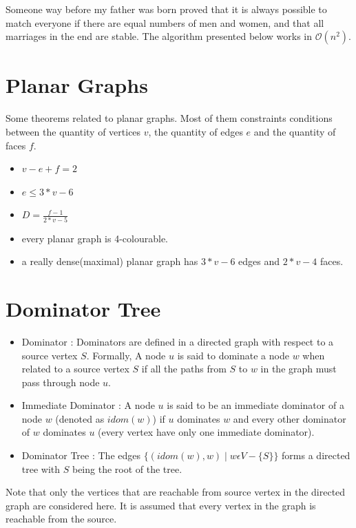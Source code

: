     Someone way before my father was born proved that it is always possible to match everyone if there are equal numbers of men and women, and that all marriages in the end are stable. The algorithm presented below works in $\mathcal{O}(n^2)$.

    
    
    \section{Planar Graphs}
    Some theorems related to planar graphs. Most of them constraints conditions between the quantity of vertices $v$, the quantity of edges $e$ and the quantity of faces $f$.
    \begin{itemize}
        \item $v - e + f = 2$
        \item $e \leq 3*v - 6$
        \item $D = \frac{f-1}{2*v-5}$
        \item every planar graph is 4-colourable.
        \item a really dense(maximal) planar graph has $3*v-6$ edges and $2*v-4$ faces.
    \end{itemize}
    \section{Dominator Tree}
    \begin{itemize}
        \item Dominator : Dominators are defined in a directed graph with respect to a source vertex $S$. Formally, A node $u$ is said to dominate a node $w$ when related to a source vertex $S$ if all the paths from $S$ to $w$ in the graph must pass through node $u$.
        \item Immediate Dominator : A node $u$ is said to be an immediate dominator of a node $w$ (denoted as $idom(w)$) if $u$ dominates $w$ and every other dominator of $w$ dominates $u$ (every vertex have only one immediate dominator).
        \item Dominator Tree :  The edges $\big\{(idom(w),w) \mid w \epsilon V - \big\{S\big\} \big\}$ forms a directed tree with $S$ being the root of the tree.
    \end{itemize}
    
    Note that only the vertices that are reachable from source vertex in the directed graph are considered here. It is assumed that every vertex in the graph is reachable from the source.

